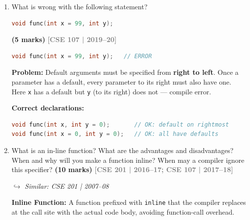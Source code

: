 \documentclass[12pt,a3paper]{article}
\newcommand{\yr}[1]{\hfill\textcolor{gray}{\small\textbf{[#1]}}}
\newcommand{\mk}[1]{\textcolor{orange!70!black}{\small\textbf{(#1 marks)}}}
\newcommand{\variant}[1]{\par\vspace{1pt}\textcolor{blue!50!black}%
  {\footnotesize\textit{$\hookrightarrow$ Similar: #1}}}
\begin{document}
\begin{enumerate}
\begin{tcolorbox}[enhanced,breakable,ansbox,colback=cC!4,colframe=cC,
  boxrule=0.8pt,arc=5pt,
  title={\textbf{Answer --- Function as l-value and r-value}},
  fonttitle=\bfseries\color{white},colbacktitle=cC]
\end{tcolorbox}

\item What is wrong with the following statement?
\begin{lstlisting}[language=C++]
void func(int x = 99, int y);
\end{lstlisting}
\mk{5}
\yr{CSE 107 | 2019--20}


\begin{tcolorbox}[enhanced,breakable,ansbox,colback=cC!4,colframe=cC,
  boxrule=0.8pt,arc=5pt,
  title={\textbf{Answer --- What is wrong with void func(int x=99, int y)?}},
  fonttitle=\bfseries\color{white},colbacktitle=cC]

\begin{lstlisting}[language=C++]
void func(int x = 99, int y);   // ERROR
\end{lstlisting}

\textbf{Problem:} Default arguments must be specified from
\textbf{right to left}.  Once a parameter has a default, every
parameter to its right must also have one.  Here \texttt{x} has a
default but \texttt{y} (to its right) does not --- compile error.

\textbf{Correct declarations:}
\begin{lstlisting}[language=C++]
void func(int x, int y = 0);       // OK: default on rightmost
void func(int x = 0, int y = 0);   // OK: all have defaults
\end{lstlisting}

\end{tcolorbox}

\item What is an in-line function? What are the advantages and disadvantages? When and why will you make a function inline? When may a compiler ignore this specifier? \mk{10}
\yr{CSE 201 | 2016--17; CSE 107 | 2017--18}
\variant{CSE 201 | 2007--08}

\begin{tcolorbox}[enhanced,breakable,ansbox,colback=cC!4,colframe=cC,
  boxrule=0.8pt,arc=5pt,
  title={\textbf{Answer --- Inline function full details}},
  fonttitle=\bfseries\color{white},colbacktitle=cC]

\textbf{Inline Function:} A function prefixed with \texttt{inline}
that the compiler replaces at the call site with the actual code
body, avoiding function-call overhead.


\end{tcolorbox}
\end{enumerate}
\end{document}

